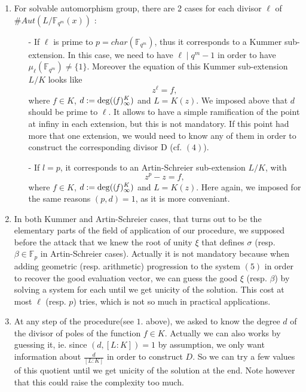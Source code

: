 \documentclass[10pt]{article}
\newcommand{\s}{\vspace{0.3cm}}
\newcommand{\fqm}{\mathbb{F}_{q^m}}
\begin{document}
\begin{enumerate}
\item For solvable automorphism group, there are 2 cases for  each divisor $\ell$ of $\#Aut(L/\fqm(x))$ :
\begin{itemize}
\item[-] If $\ell$ is prime to $p=char(\fqm)$, thus it corresponds to a Kummer sub-extension. In this case, we need to have $\ell \mid q^m-1$ in order to have $\mu_{\ell}(\fqm) \neq \{1\}$. Moreover the equation of this Kummer sub-extension $L/K$ looks like 
\[ z^{\ell} = f , \]
where $f \in K$, $d:=\rm{deg}\it((f)^K_{\infty})$ and $L=K(z)$. We imposed above that $d$ should be prime to $\ell$. It allows to have a simple ramification of the point at infiny in each extension, but this is not mandatory. If this point had more that one extension, we would need to know any of them in order to construct the corresponding divisor D (cf. $(4)$).
\item[-] If $l=p$, it corresponds to an Artin-Schreier sub-extension $L/K$, with 
\[z^p-z = f, \]
where $f \in K$, $d:=\rm{deg}\it((f)^K_{\infty})$ and $L=K(z)$. Here again, we imposed for the same reasons $(p,d)=1$, as it is more conveniant.
\end{itemize}
\item In both Kummer and Artin-Schreier cases, that turns out to be the elementary parts of the field of application of our procedure, we supposed before the attack that we knew the root of unity $\xi$ that defines $\sigma$ (resp. $\beta \in \mathbb{F}_p$ in Artin-Schreier cases). Actually it is not mandatory because when adding geometric (resp. arithmetic) progression to the system $(5)$ in order to recover the good evaluation vector, we can guess the good $\xi$ (resp. $\beta$) by solving a system for each until we get unicity of the solution. This cost at most $\ell$ (resp. $p$) tries, which is not so much in practical applications.

\item At any step of the procedure(see $1.$ above), we asked to know the degree $d$ of the divisor of poles of the function $f \in K$. Actually we can also works by guessing it, ie. since $(d,[L:K])=1$ by assumption, we only want information about $\frac{d}{[L:K]}$ in order to construct $D$. So we can try a few values of this quotient until we get unicity of the solution at the end. Note however that this could raise the complexity too much.
\end{enumerate}

\s
\end{document}
